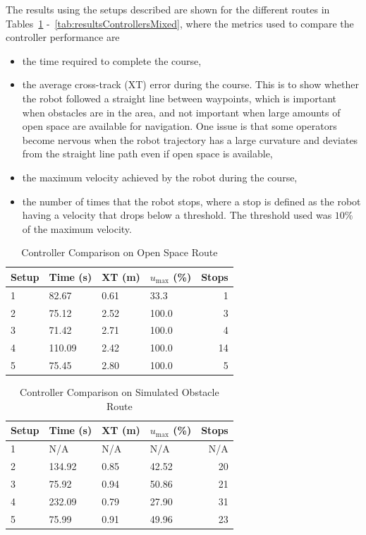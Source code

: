 The results using the setups described are shown for the different routes in Tables~\ref{tab:resultsControllersOpenSpace} -~\ref{tab:resultsControllersMixed}, where the metrics used to compare the controller performance are
\begin{itemize}
\item the time required to complete the course,
\item the average cross-track (XT) error during the course.
      This is to show whether the robot followed a straight line between waypoints, which is important when obstacles are in the area, and not important when large amounts of open space are available for navigation.
      One issue is that some operators become nervous when the robot trajectory has a large curvature and deviates from the straight line path even if open space is available,
\item the maximum velocity achieved by the robot during the course,
\item the number of times that the robot stops, where a stop is defined as the robot having a velocity that drops below a threshold.
      The threshold used was $10\%$ of the maximum velocity.
\end{itemize}

\begin{table}[ht!]
\caption{Controller Comparison on Open Space Route}
\small
\centering
\begin{tabular}{@{}llllr@{}} \toprule
Setup & Time (s) & XT (m) & $u_{\text{max}}$ (\%) & Stops \\ \midrule
1     & 82.67    & 0.61   & 33.3                  & 1     \\
2     & 75.12    & 2.52   & 100.0                 & 3     \\
3     & 71.42    & 2.71   & 100.0                 & 4     \\
4     & 110.09   & 2.42   & 100.0                 & 14    \\
5     & 75.45    & 2.80   & 100.0                 & 5     \\ \bottomrule
\end{tabular}%
\label{tab:resultsControllersOpenSpace}
\end{table}

\begin{table}[ht!]
\caption{Controller Comparison on Simulated Obstacle Route}
\small
\centering
\begin{tabular}{@{}llllr@{}} \toprule
Setup & Time (s) & XT (m) & $u_{\text{max}}$ (\%) & Stops \\ \midrule
1     & N/A      & N/A    & N/A                   & N/A   \\
2     & 134.92   & 0.85   & 42.52                 & 20    \\
3     & 75.92    & 0.94   & 50.86                 & 21    \\
4     & 232.09   & 0.79   & 27.90                 & 31    \\
5     & 75.99    & 0.91   & 49.96                 & 23    \\ \bottomrule
\end{tabular}%
\label{tab:resultsControllersObstacles}
\end{table}

